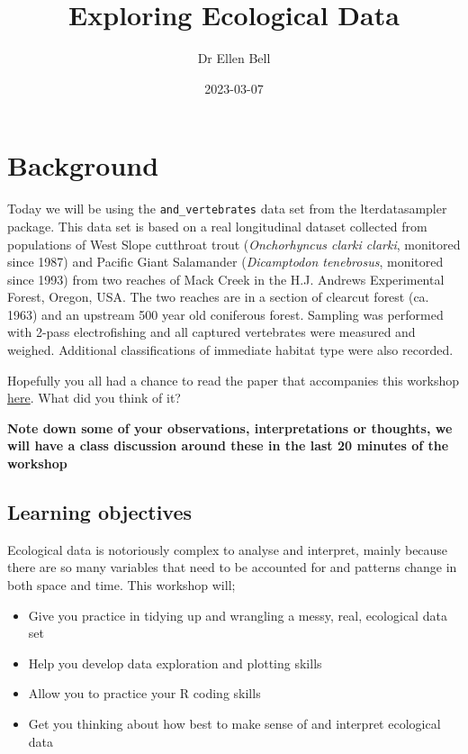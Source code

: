 \documentclass[
]{book}
\title{Exploring Ecological Data}
\author{Dr Ellen Bell}
\date{2023-03-07}
\providecommand{\tightlist}{%
  \setlength{\itemsep}{0pt}\setlength{\parskip}{0pt}}
\begin{document}
\maketitle

{
\setcounter{tocdepth}{1}
\tableofcontents
}
\hypertarget{background}{%
\chapter{Background}\label{background}}

Today we will be using the \texttt{and\_vertebrates} data set from the lterdatasampler package. This data set is based on a real longitudinal dataset collected from populations of West Slope cutthroat trout (\emph{Onchorhyncus clarki clarki}, monitored since 1987) and Pacific Giant Salamander (\emph{Dicamptodon tenebrosus}, monitored since 1993) from two reaches of Mack Creek in the H.J. Andrews Experimental Forest, Oregon, USA. The two reaches are in a section of clearcut forest (ca. 1963) and an upstream 500 year old coniferous forest. Sampling was performed with 2-pass electrofishing and all captured vertebrates were measured and weighed. Additional classifications of immediate habitat type were also recorded.

Hopefully you all had a chance to read the paper that accompanies this workshop \href{https://esajournals.onlinelibrary.wiley.com/doi/full/10.1002/ecs2.1845}{here}. What did you think of it?

\textbf{Note down some of your observations, interpretations or thoughts, we will have a class discussion around these in the last 20 minutes of the workshop}

\hypertarget{learning-objectives}{%
\section{Learning objectives}\label{learning-objectives}}

Ecological data is notoriously complex to analyse and interpret, mainly because there are so many variables that need to be accounted for and patterns change in both space and time. This workshop will;

\begin{itemize}
\tightlist
\item
  Give you practice in tidying up and wrangling a messy, real, ecological data set
\item
  Help you develop data exploration and plotting skills
\item
  Allow you to practice your R coding skills
\item
  Get you thinking about how best to make sense of and interpret ecological data
\end{itemize}
\end{document}
